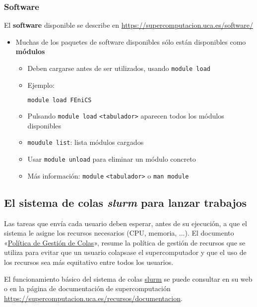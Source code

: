 \subsubsection*{Software}
El \textbf{software} disponible se describe en \url{https://supercomputacion.uca.es/software/}
\begin{itemize}
\item Muchas de los paquetes de software disponibles sólo están
  disponibles como \textbf{módulos}
  \begin{itemize}
  \item Deben cargarse antes de ser utilizados, usando
    \texttt{module load}
  \item Ejemplo:
    \begin{lstlisting}[language=sh]
      module load FEniCS
    \end{lstlisting}
  \item Pulsando \texttt{module load} \texttt{<tabulador>} aparecen
    todos los módulos disponibles
  \item \texttt{moudule list}: lista módulos cargados
  \item Usar \texttt{module unload} para eliminar un módulo concreto

  \item Más información: \texttt{module} \texttt{<tabulador>} o \texttt{man module}
  \end{itemize}
\end{itemize}

\subsection{El sistema de colas \textit{slurm} para lanzar trabajos}
\label{sec:slurm}
Las tareas que envía cada usuario deben esperar, antes de su
ejecución, a que el sistema le asigne los recursos necesarios (CPU,
memoria, ...). El documento
«\href{http://supercomputacion.uca.es/recursos/documentacion/politicas-de-gestion-de-colas}{Política
  de Gestión de Colas}», resume la política de gestión de recursos que
se utiliza para evitar que un usuario colapsase el supercomputador y
que el uso de los recursos sea más equitativo entre todos los
usuarios.

El funcionamiento básico del sistema de colas
\href{https://slurm.schedmd.com/quickstart.html}{slurm} se puede consultar en su
web o en la página de documentación de supercomputación
\url{https://supercomputacion.uca.es/recursos/documentacion}.

